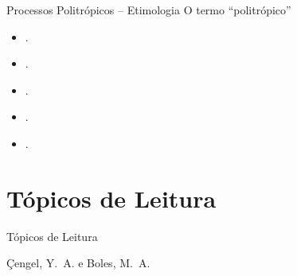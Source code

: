     \begin{frame}{Processos Politrópicos -- Etimologia}\vspace*{-2em}
        O termo ``politrópico''
        \begin{itemize}
            \item . \\[\medskipamount]
            \item . \\[\medskipamount]
            \item . \\[\medskipamount]
            \item . \\[\medskipamount]
            \item .
        \end{itemize}
    \end{frame}

\section{Tópicos de Leitura}

    \begin{frame}[allowframebreaks]{Tópicos de Leitura}
        \begin{thebibliography}{Çengel, Y.~A., 2013}
                Çengel, Y.~A. e Boles, M.~A.
        \end{thebibliography}
    \end{frame}




